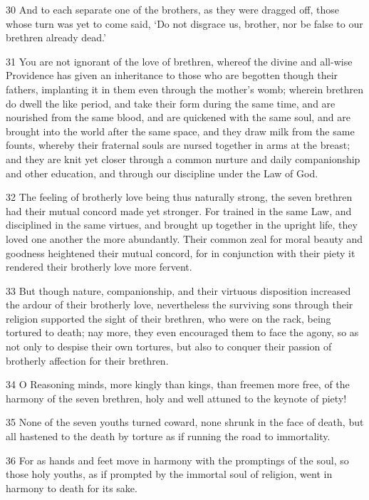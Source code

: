\par 30 And to each separate one of the brothers, as they were dragged off, those whose turn was yet to come said, ‘Do not disgrace us, brother, nor be false to our brethren already dead.’

\par 31 You are not ignorant of the love of brethren, whereof the divine and all-wise Providence has given an inheritance to those who are begotten though their fathers, implanting it in them even through the mother's womb; wherein brethren do dwell the like period, and take their form during the same time, and are nourished from the same blood, and are quickened with the same soul, and are brought into the world after the same space, and they draw milk from the same founts, whereby their fraternal souls are nursed together in arms at the breast; and they are knit yet closer through a common nurture and daily companionship and other education, and through our discipline under the Law of God.

\par 32 The feeling of brotherly love being thus naturally strong, the seven brethren had their mutual concord made yet stronger. For trained in the same Law, and disciplined in the same virtues, and brought up together in the upright life, they loved one another the more abundantly. Their common zeal for moral beauty and goodness heightened their mutual concord, for in conjunction with their piety it rendered their brotherly love more fervent.

\par 33 But though nature, companionship, and their virtuous disposition increased the ardour of their brotherly love, nevertheless the surviving sons through their religion supported the sight of their brethren, who were on the rack, being tortured to death; nay more, they even encouraged them to face the agony, so as not only to despise their own tortures, but also to conquer their passion of brotherly affection for their brethren.

\par 34 O Reasoning minds, more kingly than kings, than freemen more free, of the harmony of the seven brethren, holy and well attuned to the keynote of piety!

\par 35 None of the seven youths turned coward, none shrunk in the face of death, but all hastened to the death by torture as if running the road to immortality.

\par 36 For as hands and feet move in harmony with the promptings of the soul, so those holy youths, as if prompted by the immortal soul of religion, went in harmony to death for its sake.

